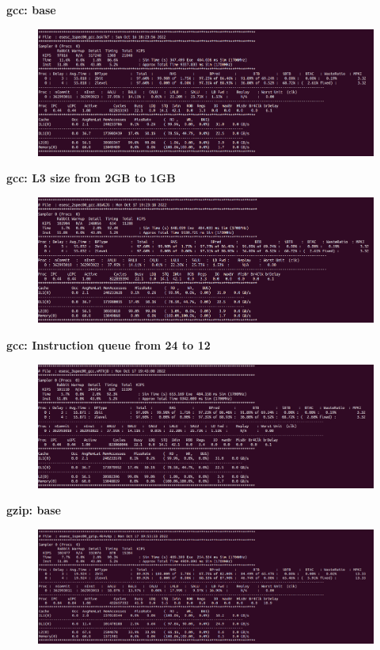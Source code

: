 \documentclass[12pt]{article}
\begin{document}
\textbf{gcc: base}
\begin{figure}[h!]
	\includegraphics[scale=0.3]{img/gcc1.png}
\end{figure}

\textbf{gcc: L3 size from 2GB to 1GB}
\begin{figure}[h!]
	\includegraphics[scale=0.3]{img/gcc2.png}
\end{figure}

\textbf{gcc: Instruction queue from 24 to 12}
\begin{figure}[h!]
	\includegraphics[scale=0.3]{img/gcc3.png}
\end{figure}

\newpage

\textbf{gzip: base}
\begin{figure}[h!]
	\includegraphics[scale=0.3]{img/gzip1.png}
\end{figure}
\end{document}
